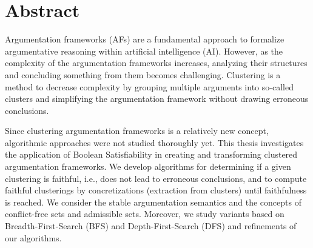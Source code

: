 \documentclass[twoside,openright]{scrreprt}
\begin{document}







\thesisdate[ ]{\today}







\printthesistitle

% 


\chapter*{Abstract}
Argumentation frameworks (AFs) are a fundamental approach to formalize argumentative reasoning within artificial intelligence (AI). However, as the complexity of the argumentation frameworks increases, analyzing their structures and concluding something from them becomes challenging. Clustering is a method to decrease complexity by grouping multiple arguments into so-called clusters and simplifying the argumentation framework without drawing erroneous conclusions.

Since clustering argumentation frameworks is a relatively new concept, algorithmic approaches were not studied thoroughly yet. This thesis investigates the application of Boolean Satisfiability in creating and transforming clustered argumentation frameworks. We develop algorithms for determining if a given clustering is faithful, i.e., does not lead to erroneous conclusions, and to compute faithful clusterings by concretizations (extraction from clusters) until faithfulness is reached. We consider the stable argumentation semantics and the concepts of conflict-free sets and admissible sets. Moreover, we study variants based on Breadth-First-Search (BFS) and Depth-First-Search (DFS) and refinements of our algorithms.
\end{document}
